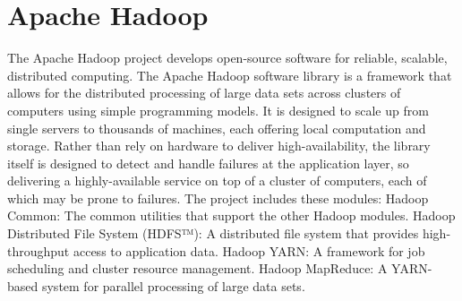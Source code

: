 \section{Apache Hadoop}

The Apache Hadoop\cite{hid-sp18-515-www-hadoop} project develops 
open-source software for reliable, scalable, distributed computing. 
The Apache Hadoop software library is a framework that allows for the 
distributed processing of large data sets across clusters of computers 
using simple programming models. It is designed to scale up from single 
servers to thousands of machines, each offering local computation and 
storage. Rather than rely on hardware to deliver high-availability, the 
library itself is designed to detect and handle failures at the 
application layer, so delivering a highly-available service on top of 
a cluster of computers, each of which may be prone to failures. 
The project includes these modules: 
Hadoop Common: The common utilities that support the other Hadoop 
modules. 
Hadoop Distributed File System (HDFS™): A distributed file system 
that provides high-throughput access to application data.
Hadoop YARN: A framework for job scheduling and cluster resource 
management.
Hadoop MapReduce: A YARN-based system for parallel processing of 
large data sets.
